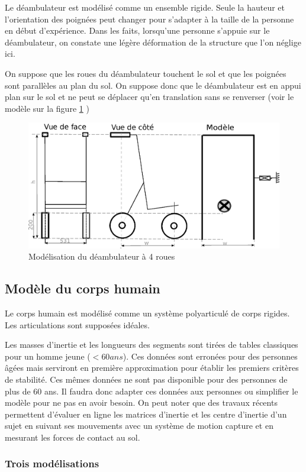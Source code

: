 \documentclass[a4paper, 10pt ]{article}
\begin{document}
Le déambulateur est modélisé comme un ensemble rigide. Seule la hauteur et l'orientation des poignées peut changer pour s'adapter à la taille de la personne en début d'expérience. Dans les faits, lorsqu'une personne s'appuie sur le déambulateur, on constate une légère déformation de la structure que l'on néglige ici. 

On suppose que les roues du déambulateur touchent le sol et que les poignées sont parallèles au plan du sol. On suppose donc que le déambulateur est en appui plan sur le sol et ne peut se déplacer qu'en translation sans se renverser (voir le modèle sur la figure \ref{fig:modelWalker} )

\begin{figure}[h]
\centering
\includegraphics[width=0.6\columnwidth]{images/model/modeleDeambulateur.eps}
\caption{Modélisation du déambulateur à 4 roues}
\label{fig:modelWalker}
\end{figure}

\subsection{Modèle du corps humain}

Le corps humain est modélisé comme un système polyarticulé de corps rigides. Les articulations sont supposées idéales.

Les masses d'inertie et les longueurs des segments sont tirées de tables classiques pour un homme jeune ($<60ans$). Ces données sont erronées pour des personnes âgées mais serviront en première approximation pour établir les premiers critères de stabilité. Ces mêmes données ne sont pas disponible pour des personnes de plus de 60 ans. Il faudra donc adapter ces données aux personnes ou simplifier le modèle pour ne pas en avoir besoin. On peut noter que des travaux récents \cite{Venture12} permettent d'évaluer en ligne les matrices d'inertie et les centre d'inertie d'un sujet en suivant ses mouvements avec un système de motion capture et en mesurant les forces de contact au sol.

\subsubsection{Trois modélisations}
\end{document}
